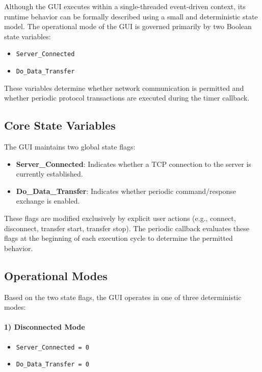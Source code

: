 Although the GUI executes within a single-threaded event-driven context, its runtime behavior can be formally described using a small and deterministic state model. The operational mode of the GUI is governed primarily by two Boolean state variables:

\begin{itemize}
	\item \texttt{Server\_Connected}
	\item \texttt{Do\_Data\_Transfer}
\end{itemize}

These variables determine whether network communication is permitted and whether periodic protocol transactions are executed during the timer callback.

\subsection{Core State Variables}
\label{sec:gui_state_variables}

The GUI maintains two global state flags:

\begin{itemize}
	\item \textbf{Server\_Connected}: Indicates whether a TCP connection to the server is currently established.
	\item \textbf{Do\_Data\_Transfer}: Indicates whether periodic command/response exchange is enabled.
\end{itemize}

These flags are modified exclusively by explicit user actions (e.g., connect, disconnect, transfer start, transfer stop). The periodic callback evaluates these flags at the beginning of each execution cycle to determine the permitted behavior.

\subsection{Operational Modes}
\label{sec:gui_operational_modes}

Based on the two state flags, the GUI operates in one of three deterministic modes:

\paragraph{1) Disconnected Mode}

\begin{itemize}
	\item \texttt{Server\_Connected = 0}
	\item \texttt{Do\_Data\_Transfer = 0}
\end{itemize}

